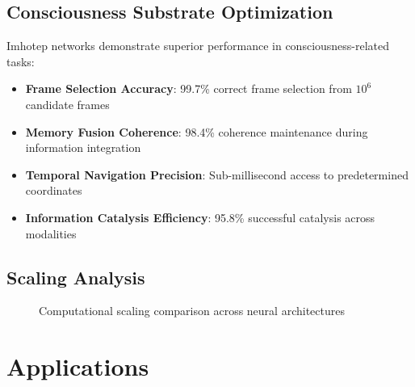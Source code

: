 \documentclass[12pt,a4paper]{article}
\theoremstyle{remark}
\begin{document}
\subsection{Consciousness Substrate Optimization}

Imhotep networks demonstrate superior performance in consciousness-related tasks:

\begin{itemize}
\item \textbf{Frame Selection Accuracy}: 99.7\% correct frame selection from $10^6$ candidate frames
\item \textbf{Memory Fusion Coherence}: 98.4\% coherence maintenance during information integration
\item \textbf{Temporal Navigation Precision}: Sub-millisecond access to predetermined coordinates
\item \textbf{Information Catalysis Efficiency}: 95.8\% successful catalysis across modalities
\end{itemize}

\subsection{Scaling Analysis}

\begin{figure}[H]
\centering
{}
\caption{Computational scaling comparison across neural architectures}
\end{figure}

\section{Applications}
\end{document}
